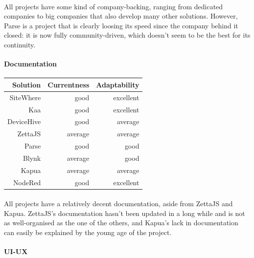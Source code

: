 \documentclass{article}
\begin{document}
\paragraph{} All projects have some kind of company-backing, ranging from dedicated companies to big companies that also develop many other solutions. However, Parse is a project that is clearly loosing its speed since the company behind it closed: it is now fully community-driven, which doesn't seem to be the best for its continuity.

\paragraph{Documentation}

\begin{center}
\begin{tabular}{r|r|r}
Solution & Currentness & Adaptability \\ \hline
SiteWhere & \cellcolor{blue!10}good & \cellcolor{green!25}excellent \\
Kaa & \cellcolor{blue!10}good & \cellcolor{green!25}excellent \\
DeviceHive & \cellcolor{blue!10}good & \cellcolor{yellow!25}average \\
ZettaJS & \cellcolor{yellow!25}average & \cellcolor{yellow!25}average \\
Parse & \cellcolor{blue!10}good & \cellcolor{blue!10}good \\
Blynk & \cellcolor{yellow!25}average & \cellcolor{blue!10}good \\
Kapua & \cellcolor{yellow!25}average & \cellcolor{yellow!25}average \\
NodeRed & \cellcolor{blue!10}good & \cellcolor{green!25}excellent \\
\end{tabular}
\end{center}

\paragraph{} All projects have a relatively decent documentation, aside from ZettaJS and Kapua. ZettaJS's documentation hasn't been updated in a long while and is not as well-organised as the one of the others, and Kapua's lack in documentation can easily be explained by the young age of the project.

\paragraph{UI-UX}
\end{document}
